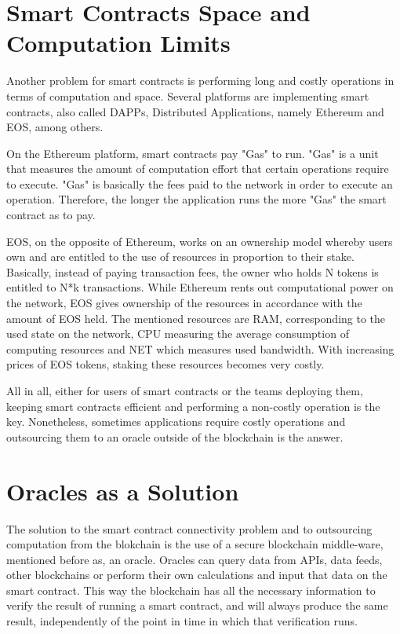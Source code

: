 \section{Smart Contracts Space and Computation Limits}

Another problem for smart contracts is performing long and costly operations in terms of computation and space. Several platforms are implementing smart contracts, also called DAPPs, Distributed Applications, namely Ethereum and EOS, among others. 

On the Ethereum platform, smart contracts pay "Gas" to run. "Gas" is a unit that measures the amount of computation effort that certain operations require to execute. "Gas" is basically the fees paid to the network in order to execute an operation. Therefore, the longer the application runs the more "Gas" the smart contract as to pay.

EOS, on the opposite of Ethereum, works on an ownership model whereby users own and are entitled to the use of resources in proportion to their stake. Basically, instead of paying transaction fees, the owner who holds N tokens is entitled to N*k transactions. While Ethereum rents out computational power on the network, EOS gives ownership of the resources in accordance with the amount of EOS held. The mentioned resources are RAM, corresponding to the used state on the network, CPU measuring the average consumption of computing resources and NET which measures used bandwidth. With increasing prices of EOS tokens, staking these resources becomes very costly.

All in all, either for users of smart contracts or the teams deploying them, keeping smart contracts efficient and performing a non-costly operation is the key. Nonetheless, sometimes applications require costly operations and outsourcing them to an oracle outside of the blockchain is the answer.



\section{Oracles as a Solution}
The solution to the smart contract connectivity problem and to outsourcing computation from the blokchain is the use of a secure blockchain middle-ware, mentioned before as, an oracle. Oracles can query data from APIs, data feeds, other blockchains or perform their own calculations and input that data on the smart contract. This way the blockchain has all the necessary information to verify the result of running a smart contract, and will always produce the same result, independently of the point in time in which that verification runs.


